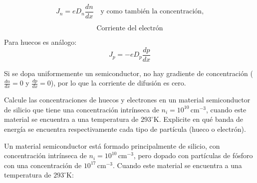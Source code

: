\documentclass[
  11pt,
  letterpaper,
   addpoints,
   answers
  ]{exam}
\begin{document}
\begin{questions}
\begin{solution}
$$J_n = e D_n \frac{dn}{dx} \quad \text{y como también la concentración,}$$

$$\text{Corriente del electrón}$$

Para huecos es análogo:
$$J_p = -e D_p \frac{dp}{dx}$$

Si se dopa uniformemente un semiconductor, no hay gradiente de concentración ($\frac{dn}{dx} = 0$ y $\frac{dp}{dx} = 0$), por lo que la corriente de difusión es cero.
\end{solution}

\question
Calcule las concentraciones de huecos y electrones en un material semiconductor de silicio que tiene una concentración intrínseca de $n_i = 10^{10}\,\text{cm}^{-3}$, cuando este material se encuentra a una temperatura de $293^\circ \text{K}$. Explicite en qué banda de energía se encuentra respectivamente cada tipo de partícula (hueco o electrón).

\question
Un material semiconductor está formado principalmente de silicio, con concentración intrínseca de $n_i = 10^{10}\,\text{cm}^{-3}$, pero dopado con partículas de fósforo con una concentración de $10^{17}\,\text{cm}^{-3}$. Cuando este material se encuentra a una temperatura de $293^\circ \text{K}$:


\end{questions}
\end{document}
